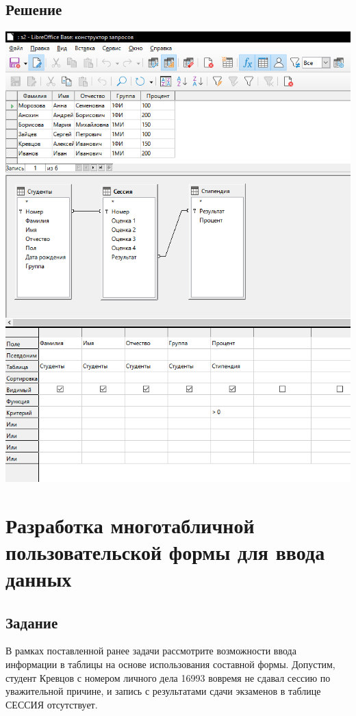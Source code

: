 \documentclass[a4paper, 12pt]{article}
\begin{document}
\subsection{Решение}
\includegraphics[width=\textwidth]{"7-1.png"}\\

\section{Разработка многотабличной пользовательской формы 
для ввода данных}
\subsection{Задание}
В  рамках  поставленной  ранее  задачи  рассмотрите  возможности 
ввода  информации  в  таблицы  на  основе  использования  составной 
формы.  Допустим,  студент  Кревцов  с  номером  личного  дела  16993 
вовремя  не  сдавал  сессию  по  уважительной  причине,  и  запись  с 
результатами сдачи экзаменов в таблице СЕССИЯ отсутствует.  
 
\end{document}
